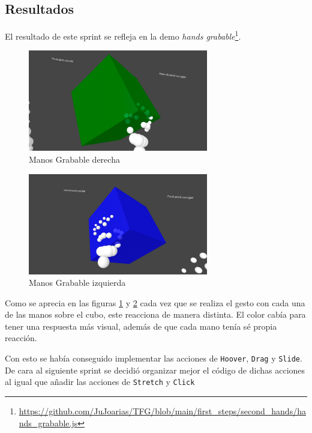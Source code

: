 \documentclass[a4paper, 12pt]{book}
\begin{document}
\subsection{Resultados}
\label{subsec:resultados5}
El resultado de este sprint se refleja en la demo \textit{hands grabable}\footnote{\url{https://github.com/JuJoarias/TFG/blob/main/first_steps/second_hands/hands_grabable.js}}. 

\begin{figure}[H] 
  \centering
  \includegraphics[width=0.7\textwidth]{img/grabable_right.jpg} 
  \caption{Manos Grabable derecha}
  \label{fig:sprint5-1}
\end{figure}

\begin{figure}[H] 
  \centering
  \includegraphics[width=0.7\textwidth]{img/grabable_left.jpg} 
  \caption{Manos Grabable izquierda}
  \label{fig:sprint5-2}
\end{figure}

Como se aprecia en las figuras \ref{fig:sprint5-1} y \ref{fig:sprint5-2} cada vez que se realiza el gesto con cada una de las manos sobre el cubo, este reacciona de manera distinta. 
El color cabía para tener una respuesta más visual, además de que cada mano tenía sé propia reacción. 

Con esto se había conseguido implementar las acciones de \texttt{Hoover}, \texttt{Drag} y \texttt{Slide}. De cara al siguiente sprint se decidió organizar mejor el código de dichas acciones al igual que añadir las acciones de \texttt{Stretch} y \texttt{Click}
\end{document}
